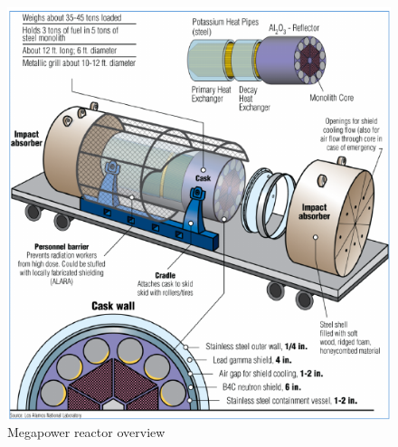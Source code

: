 \begin{figure}[hbtp]
\centering
\includegraphics[scale=0.7]{Figs/megacask.jpeg}
\caption{Megapower reactor overview}
\label{Megaoverview}
\end{figure}

